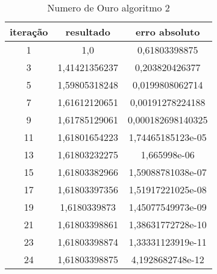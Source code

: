 \documentclass[12pt]{article}
\begin{document}
\begin{table}[ht]
\centering
\caption{Numero de Ouro algoritmo 2}
\vspace{0.1cm}
\begin{tabular}{c|c|c}
\hline   
\hline   
iteração & resultado & erro absoluto \\
\hline   
1 & 1,0 & 0,61803398875 \\
3 & 1,41421356237 & 0,203820426377 \\
5 & 1,59805318248 & 0,0199808062714 \\
7 & 1,61612120651 & 0,00191278224188 \\
9 & 1,61785129061 & 0,000182698140325 \\
11 & 1,61801654223 & 1,74465185123e-05 \\
13 & 1,61803232275 & 1,665998e-06 \\
15 & 1,61803382966 & 1,59088781038e-07 \\
17 & 1,61803397356 & 1,51917221025e-08 \\
19 & 1,6180339873 & 1,45077549973e-09 \\
21 & 1,61803398861 & 1,38631772728e-10 \\
23 & 1,61803398874 & 1,33331123919e-11 \\
24 & 1,61803398875 & 4,1928682748e-12 \\
\hline   
\hline   
\end{tabular}
\label{tabouro2}
\end{table}
\end{document}
